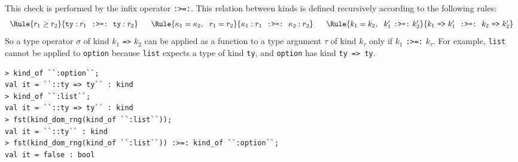 This check is performed by the infix \ML{} operator \texttt{:>=:}.
This relation between kinds is defined recursively 
according to the following rules:
%
\def\kindge{\hbox{${:}\!\!\ge\!\!{:}$}}
$$
\begin{array}{c@{\hspace{6mm}}c@{\hspace{6mm}}c}
\Rule{ r_1 \ge r_2}
     {\mbox{\tt ty} : r_1 \ \ \mbox{\tt :>=:} \ \ \mbox{\tt ty} : r_2}
&
\Rule{\kappa_1 = \kappa_2,\ \ r_1 = r_2}
     {\kappa_1 : r_1 \ \ \mbox{\tt :>=:} \ \ \kappa_2 : r_2}
&
\Rule{k_{1} = k_{2}, \ \ k_{1}' \ \mbox{\tt :>=:} \ k_{2}'}
     {k_{1}\ \mbox{\tt =>}\ k_{1}' \ \ \mbox{\tt :>=:} \ \ 
      k_{2}\ \mbox{\tt =>}\ k_{2}'}
\end{array}
$$
%
So a type operator $\sigma$ of kind $k_1$ \texttt{=>} $k_2$ can be applied
as a function to a type argument $\tau$ of kind $k_\tau$ only if
$k_1$ \texttt{:>=:} $k_\tau$.
For example, \texttt{list} cannot be applied to \texttt{option}
because \texttt{list} expects a type of kind \texttt{ty}, and
\texttt{option} has kind \texttt{ty~=>~ty}.
%
\begin{session}
\begin{verbatim}
> kind_of ``:option``;
val it = ``::ty => ty`` : kind
> kind_of ``:list``;
val it = ``::ty => ty`` : kind
> fst(kind_dom_rng(kind_of ``:list``));
val it = ``::ty`` : kind
> fst(kind_dom_rng(kind_of ``:list``)) :>=: kind_of ``:option``;
val it = false : bool
\end{verbatim}
\end{session}

